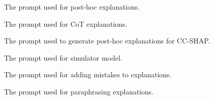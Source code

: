 \begin{figure}[h]

\caption{The prompt used for post-hoc explanations.}
\label{fig:posthoc_prompt}
\end{figure}


\begin{figure}[h]

\caption{The prompt used for CoT explanations.}
\label{fig:cot_prompt}
\end{figure}

\begin{figure}[h]

\caption{The prompt used to generate post-hoc explanations for CC-SHAP.}
\label{fig:ccshap_posthoc_prompt}
\end{figure}

\begin{figure}[h]

\caption{The prompt used for simulator model.}
\label{fig:simulator_prompt}
\end{figure}

\begin{figure}[h]

\caption{The prompt used for adding mistakes to explanations.}
\label{fig:add_mistake_prompt}
\end{figure}

\begin{figure}[h]

\caption{The prompt used for paraphrasing explanations.}
\label{fig:paraphrase_prompt}
\end{figure}

